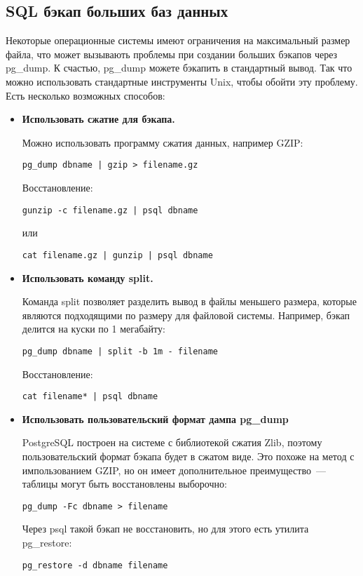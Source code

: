 \subsection{SQL бэкап больших баз данных}
Некоторые операционные системы имеют ограничения на максимальный размер файла, что может вызывають проблемы при создании 
больших бэкапов через pg\_dump. К счастью, pg\_dump можете бэкапить в стандартный вывод. Так что можно использовать 
стандартные инструменты Unix, чтобы обойти эту проблему. Есть несколько возможных способов:
\begin{itemize}
\item \textbf{Использовать сжатие для бэкапа.} 

Можно использовать программу сжатия данных, например GZIP:
\begin{lstlisting}[label=lst:backups7,caption=Сжатие бэкапа PostgreSQL]
pg_dump dbname | gzip > filename.gz
\end{lstlisting}

Восстановление:
\begin{lstlisting}[label=lst:backups8,caption=Восстановление бэкапа PostgreSQL]
gunzip -c filename.gz | psql dbname
\end{lstlisting}
или
\begin{lstlisting}[label=lst:backups9,caption=Восстановление бэкапа PostgreSQL]
cat filename.gz | gunzip | psql dbname
\end{lstlisting}

\item \textbf{Использовать команду split.} 

Команда split позволяет разделить вывод в файлы меньшего размера, которые являются подходящими по размеру для файловой системы. 
Например, бэкап делится на куски по 1 мегабайту:
\begin{lstlisting}[label=lst:backups10,caption=Создание бэкапа PostgreSQL]
pg_dump dbname | split -b 1m - filename
\end{lstlisting}
Восстановление:
\begin{lstlisting}[label=lst:backups11,caption=Восстановление бэкапа PostgreSQL]
cat filename* | psql dbname
\end{lstlisting}

\item \textbf{Использовать пользовательский формат дампа pg\_dump}

PostgreSQL построен на системе с библиотекой сжатия Zlib, поэтому пользовательский формат бэкапа будет в сжатом виде. 
Это похоже на метод с импользованием GZIP, но он имеет дополнительное преимущество~--- таблицы могут быть восстановлены выборочно:
\begin{lstlisting}[label=lst:backups12,caption=Создание бэкапа PostgreSQL]
pg_dump -Fc dbname > filename
\end{lstlisting}
Через psql такой бэкап не восстановить, но для этого есть утилита pg\_restore:
\begin{lstlisting}[label=lst:backups13,caption=Восстановление бэкапа PostgreSQL]
pg_restore -d dbname filename
\end{lstlisting}

\end{itemize}

